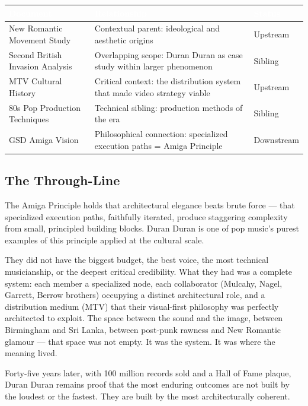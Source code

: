 \documentclass[11pt,letterpaper]{article}
\newcommand{\tableheader}[1]{\textbf{\sffamily\textcolor{white}{#1}}}
\begin{document}
\begin{center}
\begin{tabularx}{\textwidth}{L{4cm}XC{2.5cm}}
\toprule
{}
\tableheader{Document} & \tableheader{Relationship} & \tableheader{Status} \\
\midrule
New Romantic Movement Study & Contextual parent: ideological and aesthetic origins & Upstream \\
Second British Invasion Analysis & Overlapping scope: Duran Duran as case study within larger phenomenon & Sibling \\
MTV Cultural History & Critical context: the distribution system that made video strategy viable & Upstream \\
80s Pop Production Techniques & Technical sibling: production methods of the era & Sibling \\
GSD Amiga Vision & Philosophical connection: specialized execution paths = Amiga Principle & Downstream \\
\bottomrule
\end{tabularx}
\end{center}

\subsection{The Through-Line}

The Amiga Principle holds that architectural elegance beats brute force --- that specialized execution paths, faithfully iterated, produce staggering complexity from small, principled building blocks. Duran Duran is one of pop music's purest examples of this principle applied at the cultural scale.

They did not have the biggest budget, the best voice, the most technical musicianship, or the deepest critical credibility. What they had was a complete system: each member a specialized node, each collaborator (Mulcahy, Nagel, Garrett, Berrow brothers) occupying a distinct architectural role, and a distribution medium (MTV) that their visual-first philosophy was perfectly architected to exploit. The space between the sound and the image, between Birmingham and Sri Lanka, between post-punk rawness and New Romantic glamour --- that space was not empty. It was the system. It was where the meaning lived.

Forty-five years later, with 100 million records sold and a Hall of Fame plaque, Duran Duran remains proof that the most enduring outcomes are not built by the loudest or the fastest. They are built by the most architecturally coherent.
\end{document}
